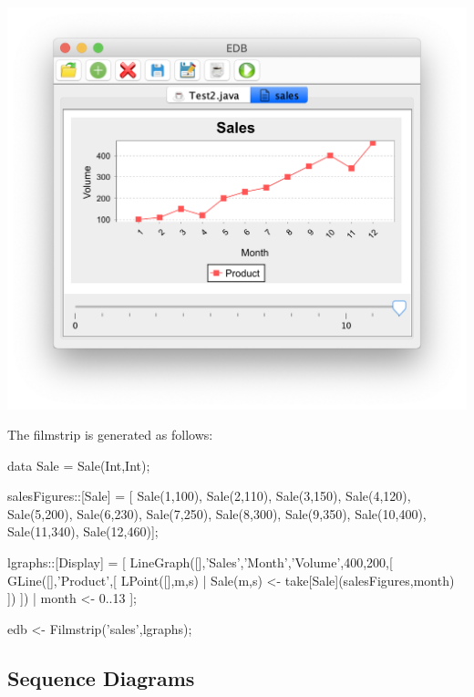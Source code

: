 \documentclass[5p,times]{elsarticle}
\begin{document}
\begin{center}
\includegraphics[width=0.9\columnwidth]{film3}
\end{center}
The filmstrip is generated as follows:
\begin{ESL}
data Sale = Sale(Int,Int);

salesFigures::[Sale] = [
  Sale(1,100),
  Sale(2,110),
  Sale(3,150),
  Sale(4,120),
  Sale(5,200),
  Sale(6,230),
  Sale(7,250),
  Sale(8,300),
  Sale(9,350),
  Sale(10,400),
  Sale(11,340),
  Sale(12,460)];
  
  
lgraphs::[Display] = [ 
  LineGraph([],'Sales','Month','Volume',400,200,[
    GLine([],'Product',[ LPoint([],m,s) 
    | Sale(m,s) <- take[Sale](salesFigures,month)
    ])
  ]) | month <- 0..13 ];
  
edb <- Filmstrip('sales',lgraphs);
\end{ESL}

\subsection{Sequence Diagrams}

\label{sec:sequence_diagram}
\end{document}
